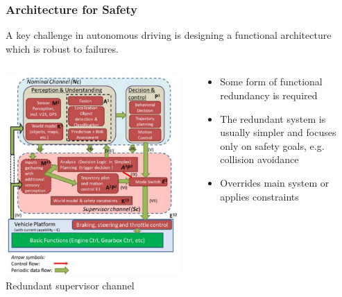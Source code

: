 \begin{frame}
\frametitle{Architecture for Safety}
A key challenge in autonomous driving is designing a functional architecture
which is robust to failures.

\begin{columns}[T]
    \begin{column}{0.35\textwidth}
        \centering
        \includegraphics[width=0.95\textwidth]{images/redundant_architecture.png}\\
        \vspace{0.2cm}
        \tiny{Redundant supervisor channel \cite{Torngren2018}}
    \end{column}
    \begin{column}{0.65\textwidth}
        \begin{itemize}
            \item Some form of functional redundancy is required
            \item The redundant system is usually simpler and focuses only on
                safety goals, e.g. collision avoidance
            \item Overrides main system or applies constraints
        \end{itemize}

\end{column}
\end{columns}
\end{frame}
